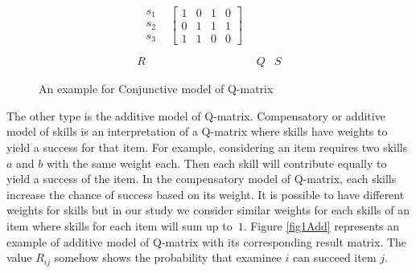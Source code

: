 \begin{figure}
\begin{footnotesize}
\[\begin{array}{ccc}
\begin{array}{cc}
\begin{array}{c}
s_{1}\\
s_{2}\\
s_{3}
\end{array} & \left[\begin{array}{cccc}
1 & 0 & 1 & 0\\
0 & 1 & 1 & 1\\
1 & 1 & 0 & 0
\end{array}\right]
\end{array}\\
\\
R & Q & S
\end{array}
\]
 \end{footnotesize} \caption{An example for Conjunctive model of Q-matrix}


\label{fig1} 
\end{figure}


The other type is the additive model of Q-matrix. Compensatory or additive model of skills is an interpretation of a Q-matrix where skills have weights to yield a success for that item. For example, considering an item requires two skills $a$ and $b$ with the same weight each. Then each skill will contribute equally to yield a success of the item. In the compensatory model of Q-matrix, each skills increase the chance of success based on its weight. It is possible to have different weights for skills but in our study we consider similar weights for each skills of an item where skills for each item will sum up to~$1$. Figure \ref{fig1Add} represents an example of additive model of Q-matrix with its corresponding result matrix. The value $R_{ij}$  somehow shows the probability that examinee $i$ can succeed item $j$.

